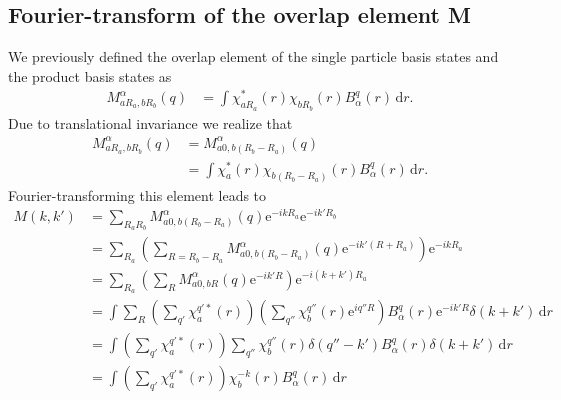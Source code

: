 \documentclass[12pt,a4paper]{scrartcl}
\numberwithin{equation}{section}
\begin{document}
\subsection{Fourier-transform of the overlap element M}
We previously defined the overlap element of the single particle
basis states and the product basis states as
\begin{align}
 M^{\alpha}_{aR_a,bR_b}(q)
 &= \int \chi^*_{aR_a}(r) \chi_{bR_b}(r) B^{q}_{\alpha}(r) \, \mathrm{d}r.
\end{align}
Due to translational invariance we realize that
\begin{align}
 M^{\alpha}_{aR_a,bR_b}(q)
 &= M^{\alpha}_{a0,b(R_b-R_a)}(q) \\
 &= \int \chi^*_{a}(r) \chi_{b(R_b-R_a)}(r) B^{q}_{\alpha}(r) \, \mathrm{d}r.
\end{align}
Fourier-transforming this element leads to
\begin{align}
M(k,k')
&= \sum_{R_aR_b} M^{\alpha}_{a0,b(R_b-R_a)}(q) \mathrm{e}^{-i k R_a}\mathrm{e}^{-i k' R_b} \\
&= \sum_{R_a}\left(
           \sum_{R=R_b-R_a} M^{\alpha}_{a0,b(R_b-R_a)}(q) \mathrm{e}^{-i k' (R+R_a)} 
            \right) \mathrm{e}^{-i k R_a} \\
&= \sum_{R_a}\left(
           \sum_{R} M^{\alpha}_{a0,bR}(q) \mathrm{e}^{-i k' R} 
            \right) \mathrm{e}^{-i (k+k') R_a} \\
&=  \int \sum_{R} \left(\sum_{q'} \chi^{q'*}_{a}(r) \right)
          \left( \sum_{q''} \chi^{q''}_{b}(r) \mathrm{e}^{i q'' R} \right)
           B^{q}_{\alpha}(r) \mathrm{e}^{-i k' R} \delta(k+k') \, \mathrm{d}r \\
%
&= \int \left(\sum_{q'} \chi^{q'*}_{a}(r) \right)
           \sum_{q''} \chi^{q''}_{b}(r) \delta(q''-k')
           B^{q}_{\alpha}(r)  \delta(k+k') \, \mathrm{d}r \\
%
&= \int \left(\sum_{q'} \chi^{q'*}_{a}(r) \right)
           \chi^{-k}_{b}(r)
           B^{q}_{\alpha}(r)  \, \mathrm{d}r
\end{align}


\clearpage 


\end{document}

